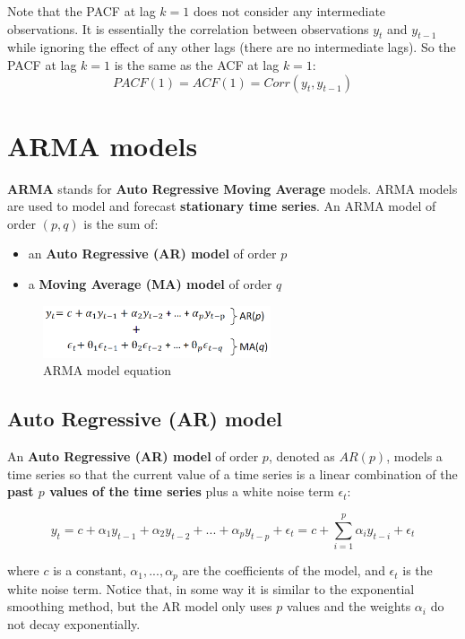 Note that the PACF at lag $k = 1$ does not consider any intermediate observations. It
is essentially the correlation between observations $y_t$ and $y_{t-1}$ while ignoring
the effect of any other lags (there are no intermediate lags). So the PACF at lag $k = 1$
is the same as the ACF at lag $k = 1$:
$$PACF(1) = ACF(1) = Corr(y_t, y_{t-1})$$

\section{ARMA models}

\textbf{ARMA} stands for \textbf{Auto Regressive Moving Average} models. 
ARMA models are used to model and forecast \textbf{stationary time series}. An ARMA
model of order $(p, q)$ is the sum of:
\begin{itemize}
    \item an \textbf{Auto Regressive (AR) model} of order $p$
    \item a \textbf{Moving Average (MA) model} of order $q$ 
\end{itemize}

\begin{figure}[H]
    \centering
    \includegraphics[width=0.6\textwidth]{figures/arma_eq.png}
    \caption{ARMA model equation}
    \label{fig:arma_eq}
\end{figure}

\subsection{Auto Regressive (AR) model}

An \textbf{Auto Regressive (AR) model} of order $p$, denoted as $AR(p)$, models a 
time series so that the current value of a time series is a linear combination of
the \textbf{past $p$ values of the time series} plus a white noise term $\epsilon_t$:

\begin{equation}
    y_t = c + \alpha_1 y_{t-1} + \alpha_2 y_{t-2} + ... + \alpha_p y_{t-p} + \epsilon_t = c + \sum_{i=1}^p \alpha_i y_{t-i} + \epsilon_t
\end{equation}

where $c$ is a constant, $\alpha_1, ..., \alpha_p$ are the coefficients of the model,
and $\epsilon_t$ is the white noise term. Notice that, in some way it is similar to 
the exponential smoothing method, but the AR model only uses $p$ values and the
weights $\alpha_i$ do not decay exponentially.\\

